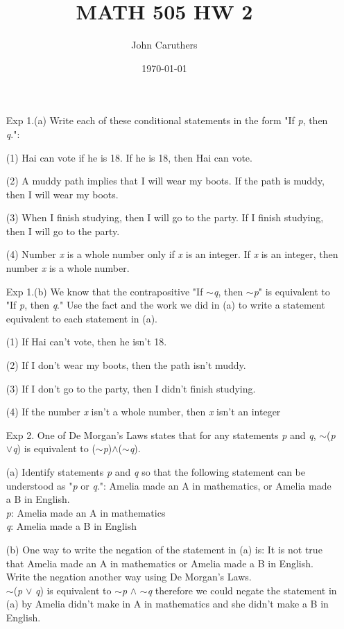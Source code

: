 \documentclass{article}
\title{MATH 505 HW 2}
\author{John Caruthers}
\date\today
\begin{document}
\maketitle

\begin{itemize}
    \item [Exp 1.(a)] Write each of these conditional statements in the form "If \emph{p}, then \emph{q}.":
    
    (1) Hai can vote if he is 18. {\color{blue} If he is 18, then Hai can vote.}
    
    (2) A muddy path implies that I will wear my boots. {\color{blue} If the path is muddy, then I will wear my boots.}
    
    (3) When I finish studying, then I will go to the party. {\color{blue} If I finish studying, then I will go to the party.}
    
    (4) Number \emph{x} is a whole number only if \emph{x} is an integer. {\color{blue} If \emph{x} is an integer, then number \emph{x} is a whole number.}
    
    \item [Exp 1.(b)] We know that the contrapositive "If $\sim$\emph{q}, then $\sim$\emph{p}" is equivalent to "If \emph{p}, then \emph{q}." Use the fact and the work we did in (a) to write a statement equivalent to each statement in (a).
    
    (1) If Hai can't vote, then he isn't 18.
    
    (2) If I don't wear my boots, then the path isn't muddy.
    
    (3) If I don't go to the party, then I didn't finish studying.
    
    (4) If the number \emph{x} isn't a whole number, then \emph{x} isn't an integer
    
    \item [Exp 2.] One of De Morgan's Laws states that for any statements \emph{p} and \emph{q}, $\sim$(\emph{p}$\vee$\emph{q}) is equivalent to ($\sim$\emph{p})$\wedge$($\sim$\emph{q}).
    
    (a) Identify statements \emph{p} and \emph{q} so that the following statement can be understood as "\emph{p} or \emph{q}.": Amelia made an A in mathematics, or Amelia made a B in English.\\
    \emph{p}: Amelia made an A in mathematics\\
    \emph{q}: Amelia made a B in English
    
    (b) One way to write the negation of the statement in (a) is: It is not true that Amelia made an A in mathematics or Amelia made a B in English.  Write the negation another way using De Morgan's Laws.\\
    $\sim$(\emph{p} $\vee$ \emph{q}) is equivalent to $\sim$\emph{p} $\wedge$ $\sim$\emph{q} therefore we could negate the statement in (a) by {\color{blue} Amelia didn't make in A in mathematics and she didn't make a B in English.}
    

\end{itemize}
\end{document}
